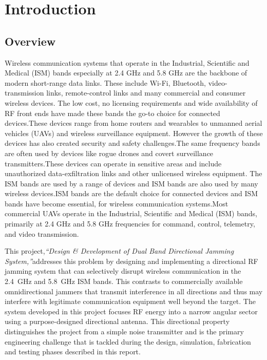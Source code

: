 \documentclass[12pt,a4paper]{report}
\begin{document}
	
	\chapter{Introduction}
	
	\section{Overview}
	Wireless communication systems that operate in the Industrial, Scientific and Medical (ISM) bands especially at 2.4 GHz and 5.8 GHz are the backbone of modern short-range data links.
	These include Wi-Fi, Bluetooth, video-transmission links, remote-control links and many commercial and consumer wireless devices.
	The low cost, no licensing requirements and wide availability of RF front ends have made these bands the go-to choice for connected devices.These devices range from home routers and wearables to unmanned aerial vehicles (UAVs) and wireless surveillance equipment.
	However the growth of these devices has also created security and safety challenges.The same frequency bands are often used by devices like rogue drones and covert surveillance transmitters.These devices can operate in sensitive areas and include unauthorized data-exfiltration links and other unlicensed wireless equipment.
	The ISM bands are used by a range of devices and ISM bands are also used by many wireless devices.ISM bands are the default choice for connected devices and ISM bands have become essential, for wireless communication systems.Most commercial UAVs operate in the Industrial, Scientific and Medical (ISM) bands, primarily at 2.4 GHz and 5.8 GHz frequencies for command, control, telemetry, and video transmission.
	\vspace{0.5cm}
	
	This project,\textit{``Design \& Development of Dual Band Directional Jamming System,''}addresses this problem by designing and implementing a directional RF jamming system that can selectively disrupt wireless communication in the 2.4~GHz and 5.8~GHz ISM bands. This contrasts to commercially available omnidirectional jammers that transmit interference in all directions and thus may interfere with legitimate communication equipment well beyond the target. The system developed in this project focuses RF energy into a narrow angular sector using a purpose-designed directional antenna. This directional property distinguishes the project from a simple noise transmitter and is the primary engineering challenge that is tackled during the design, simulation, fabrication and testing phases described in this report.
	\vspace{0.5cm}
	
\end{document}
